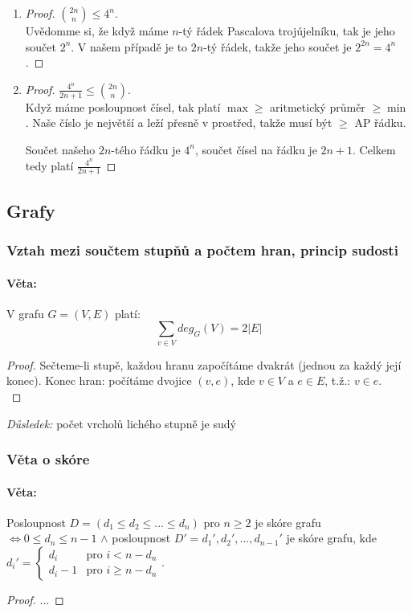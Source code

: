 \documentclass[10pt,a4paper]{article}
\begin{document}
\begin{enumerate}
    \item \begin{proof} 
        $\binom{2n}n \leq 4^n$.\\ 
        Uvědomme si, že když máme $n$-tý řádek Pascalova trojújelníku, tak je jeho součet $2^n$. V našem případě je to $2n$-tý řádek, takže jeho součet je $2^{2n} = 4^n$.
    \end{proof}
    \item \begin{proof} 
        $\frac{4^n}{2n+1} \leq \binom{2n}n$.\\
        Když máme posloupnost čísel, tak platí $\max \geq$ aritmetický průměr $\geq \min$. Naše číslo je největší a leží přesně v prostřed, takže musí být $\geq$ AP řádku.

        Součet našeho $2n$-tého řádku je $4^n$, součet čísel na řádku je $2n+1$. Celkem tedy platí $\frac{4^n}{2n+1}$
    \end{proof}
\end{enumerate}


\subsection{Grafy}


\subsubsection{Vztah mezi součtem stupňů a počtem hran, princip sudosti}
\paragraph*{Věta: } V grafu $G=(V, E)$ platí:
\[
    \sum_{v\in V} deg_G (V) = 2|E|
\]
\begin{proof}
    Sečteme-li stupě, každou hranu započítáme dvakrát (jednou za každý její konec).
    Konec hran: počítáme dvojice $(v, e)$, kde $v \in V$ a $e \in E$, t.ž.: $v \in e$.\\
\end{proof}
\textit{Důsledek:} počet vrcholů lichého stupně je sudý


\subsubsection{Věta o skóre}
\paragraph*{Věta: } Posloupnost $D = (d_1 \leq d_2 \leq ... \leq d_n)$ pro $n \geq 2$ je skóre grafu $\iff 0\leq d_n \leq n-1$ $\land$ posloupnost $D' = d_1', d_2', ..., d_{n-1}'$ je skóre grafu, kde $d_i' = \begin{cases}
    d_i & \text{pro } i < n - d_n\\
    d_i -1 & \text{pro } i \geq n - d_n
\end{cases}$.
\begin{proof}
    ...
\end{proof}
\end{document}
